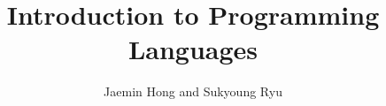 \documentclass[
  b5paper, %
  fontsize=10pt, %
  twoside=true, %
  numbers=noenddot, %
]{kaobook}
\begin{document}


\title{Introduction to Programming Languages}

\author{Jaemin Hong and Sukyoung Ryu}

\date{}



\frontmatter %




\makeatletter
\uppertitleback{\@titlehead} %

\end{document}
